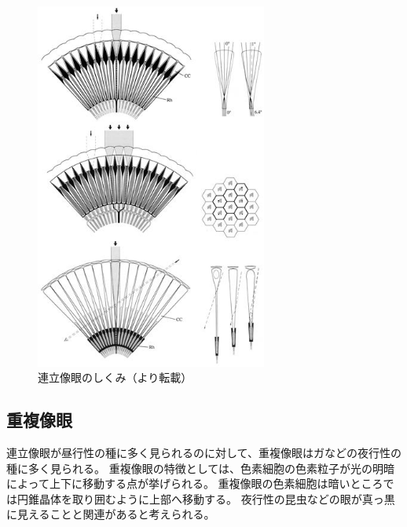 \begin{figure}[hn]
  \centering
  \includegraphics[width=3.0in]{./img/renrituzougan.jpg}
  \caption{連立像眼のしくみ（\cite{arikawa-zougan}より転載）}
  \label{FRenritsu}
\end{figure}


\subsection{重複像眼}

連立像眼が昼行性の種に多く見られるのに対して、重複像眼はガなどの夜行性の種に多く見られる。
重複像眼の特徴としては、色素細胞の色素粒子が光の明暗によって上下に移動する点が挙げられる。
重複像眼の色素細胞は暗いところでは円錐晶体を取り囲むように上部へ移動する。
夜行性の昆虫などの眼が真っ黒に見えることと関連があると考えられる。

